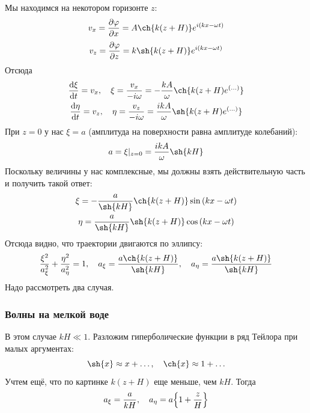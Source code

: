 Мы находимся на некотором горизонте $z$:
\begin{equation}
    v_x = \pdv{\phi}{x} = A\ch{k(z+H)}e^{i(kx-\omega t)}
\end{equation}
\begin{equation}
    v_z = \pdv{\phi}{z} = k\sh{k(z+H)}e^{i(kx-\omega t)} 
\end{equation}
Отсюда
\begin{gather}
    \dv{\xi}{t} = v_x, \quad \xi=\frac{v_x}{-i\omega} = -\frac{kA}{\omega}\ch{k(z+H)e^{(\ldots)}}\\
    \dv{\eta}{t} = v_z, \quad \eta=\frac{v_z}{-i\omega} = \frac{ikA}{\omega}\sh{k(z+H)e^{(\ldots)}} \\
\end{gather}
При $z = 0$ у нас $\xi = a$ (амплитуда на поверхности равна амплитуде колебаний):
\begin{equation}
    a = \xi|_{z = 0} = \frac{ikA}{\omega}\sh{kH}
\end{equation}
Поскольку величины у нас комплексные, мы должны взять действительную часть и получить такой ответ:
\begin{gather}
    \xi = -\frac{a}{\sh{kH}}\ch{k(z+H)}\sin{(kx-\omega t)}\\
    \eta = \frac{a}{\sh{kH}}\sh{k(z+H)}\cos{(kx-\omega t)}\\
\end{gather}
Отсюда видно, что траектории двигаются по эллипсу:
\begin{equation}
    \frac{\xi^2}{a_\xi^2}+\frac{\eta^2}{a_\eta^2} = 1, 
    \quad a_\xi = \frac{a\ch{k(z+H)}}{\sh{kH}}
    , \quad a_\eta = \frac{a\sh{k(z+H)}}{\sh{kH}}
\end{equation}
Надо рассмотреть два случая.


\subsubsection{Волны на мелкой воде}
В этом случае $kH\ll 1$. Разложим гиперболические функции  в ряд Тейлора при малых аргументах:
\begin{equation}
    \sh{x}\approx x+\ldots, \quad \ch{x}\approx 1+\ldots
\end{equation}
Учтем ещё, что по картинке $k(z+H)$ еще меньше, чем $kH$. Тогда
\begin{equation}
    a_\xi = \frac{a}{kH}, \quad
    a_\eta = a\qty{1+\frac{z}{H}}
\end{equation}

